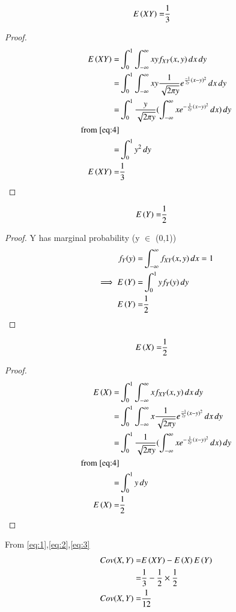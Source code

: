 \documentclass[journal,12pt,twocolumn]{IEEEtran}
\begin{document}
\begin{lemma}
\begin{align}
   E\left(XY\right)=&\frac{1}{3}   
\end{align}
\end{lemma}
\begin{proof}
\begin{align}
    E\left(XY\right)=&\int_{0}^{1}\int_{-\infty}^{\infty}xy f_{XY}(x,y)\,dx\,dy\\
    =&\int_{0}^{1}\int_{-\infty}^{\infty}xy\frac{1}{\sqrt{2\pi y}}e^{\frac{-1}{2y}(x-y)^2}\,dx \,dy\\
    =&\int_{0}^{1}\frac{y}{\sqrt{2\pi y}}(\int_{-\infty}^{\infty}xe^{-\frac{1}{2y}(x-y)^2}\,dx)\,dy\\
    \text{from \eqref{eq:4}}\\
    =&\int_{0}^{1}y^2 \,dy\\
     E\left(XY\right)=&\frac{1}{3} \label{eq:1}
    \end{align}
\end{proof} 

\begin{lemma}
\begin{align}
     E\left(Y\right)=&\frac{1}{2}
\end{align}
\end{lemma}
\begin{proof}
Y has marginal probability (y $\in$ (0,1))
\begin{align}
    f_Y(y)=&\int_{-\infty}^{\infty}f_{XY}(x,y)\,dx =1\\
    \implies E\left(Y\right)=&\int_{0}^{1} y f_{Y}(y)\,dy\\
    E\left(Y\right)=&\frac{1}{2} \label{eq:2}
\end{align}
\end{proof}

\begin{lemma}
\begin{align}
  E\left(X\right)=&\frac{1}{2}   
\end{align}
\end{lemma}
\begin{proof}
\begin{align}
 E\left(X\right)=&\int_{0}^{1}\int_{-\infty}^{\infty}x f_{XY}(x,y)\,dx\,dy\\
    =&\int_{0}^{1}\int_{-\infty}^{\infty}x\frac{1}{\sqrt{2\pi y}}e^{\frac{-1}{2y}(x-y)^2}\,dx \,dy\\
     =&\int_{0}^{1}\frac{1}{\sqrt{2\pi y}}(\int_{-\infty}^{\infty}xe^{-\frac{1}{2y}(x-y)^2}\,dx)\,dy\\
     \text{from \eqref{eq:4}}\\
    =&\int_{0}^{1}y\,dy\\
E\left(X\right)=&\frac{1}{2} \label{eq:3}
\end{align}
\end{proof}
From \eqref{eq:1},\eqref{eq:2},\eqref{eq:3}
\begin{align}
Cov(X,Y)=&E\left(XY\right)-E\left(X\right)E\left(Y\right)\\
       =&\frac{1}{3}-\frac{1}{2}\times \frac{1}{2}\\
Cov(X,Y)=&\frac{1}{12}
\end{align}
\end{document}
